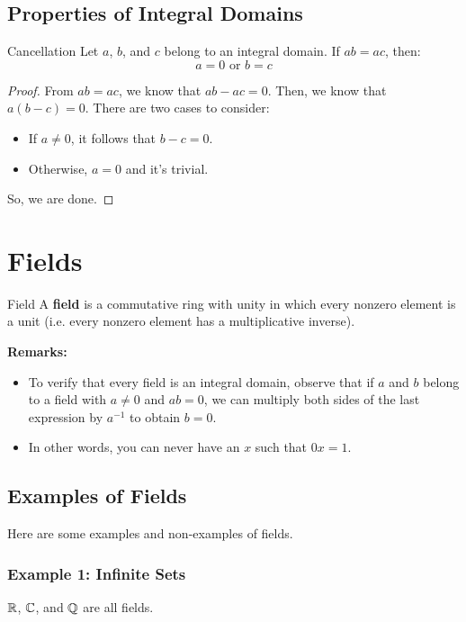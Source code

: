 \documentclass[letterpaper]{article}
\begin{document}
\subsection{Properties of Integral Domains}
\begin{theorem}{Cancellation}{}
    Let $a$, $b$, and $c$ belong to an integral domain. If $ab = ac$, then: 
    \[a = 0 \text{ or } b = c\]
\end{theorem}
\begin{mdframed}[]
    \begin{proof}
        From $ab = ac$, we know that $ab - ac = 0$. Then, we know that $a(b - c) = 0$. There are two cases to consider:
        \begin{itemize}
            \item If $a \neq 0$, it follows that $b - c = 0$.
            \item Otherwise, $a = 0$ and it's trivial.
        \end{itemize}
        So, we are done. 
    \end{proof}
\end{mdframed}

\section{Fields}

\begin{definition}{Field}{}
    A \textbf{field} is a commutative ring with unity in which every nonzero element is a unit (i.e. every nonzero element has a multiplicative inverse).
\end{definition}
\textbf{Remarks:} 
\begin{itemize}
    \item To verify that every field is an integral domain, observe that if $a$ and $b$ belong to a field with $a \neq 0$ and $ab = 0$, we can multiply both sides of the last expression by $a^{-1}$ to obtain $b = 0$.
    \item In other words, you can never have an $x$ such that $0x = 1$. 
\end{itemize}

\subsection{Examples of Fields}
Here are some examples and non-examples of fields.

\subsubsection{Example 1: Infinite Sets}
$\mathbb{R}$, $\mathbb{C}$, and $\mathbb{Q}$ are all fields. 
\end{document}

